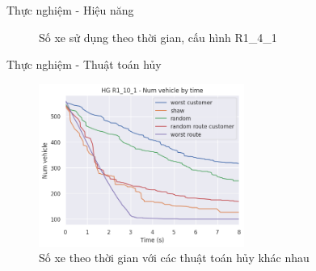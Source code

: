 \begin{frame}{Thực nghiệm - Hiệu năng}
  \begin{figure}
    \centering
    \quad
  \caption{Số xe sử dụng theo thời gian, cấu hình R1\_4\_1}
  \end{figure}
\end{frame}


\begin{frame}{Thực nghiệm - Thuật toán hủy}
  \begin{figure}[H] %
    \centering %
    \includegraphics[width=0.6\textwidth]{figures/nv_time_des_10s_R1_10_1.png}
    \caption{Số xe theo thời gian với các thuật toán hủy khác nhau}
    \label{fig:nv_des_01}
  \end{figure}
\end{frame}

